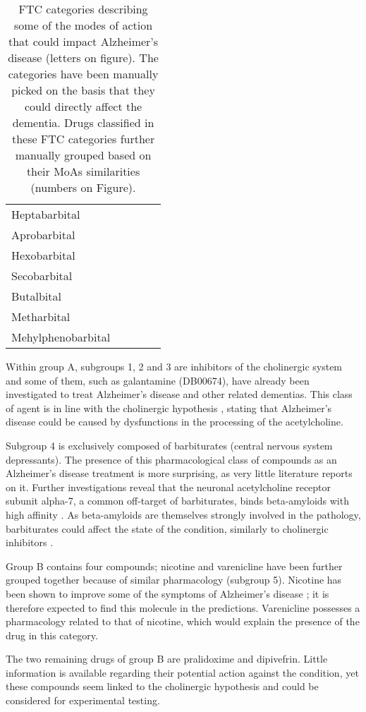 \begin{table}[htbp]
\begin{tabular}{|p{2.5cm}|p{2.5cm}|p{2.5cm}|p{2.5cm}|p{2.5cm}|}
Heptabarbital &  &  &  &  \\ 
Aprobarbital &  &  &  &  \\ 
Hexobarbital &  &  &  &  \\ 
Secobarbital &  &  &  &  \\ 
Butalbital &  &  &  &  \\ 
Metharbital &  &  &  &  \\ 
Mehylphenobarbital &  &  &  &  \\ \hline
\end{tabular}
\caption{FTC categories describing some of the modes of 
action that could impact Alzheimer's disease (letters on figure). The categories have been manually picked on the basis that they could directly affect
the dementia. Drugs classified in these FTC categories further 
manually grouped based on their MoAs similarities (numbers on Figure).}
\label{table:alz}
\end{table}

Within group A, subgroups 1, 2 and 3 are inhibitors of the cholinergic system and some of them, such as galantamine (DB00674), have  already been investigated to treat Alzheimer's disease and other related dementias. This class of agent is in line with the cholinergic hypothesis \citep{babic1999cholinergic}, stating that Alzheimer's disease could be caused by dysfunctions in the processing of the acetylcholine.

Subgroup 4 is exclusively composed of barbiturates (central nervous system depressants). The presence of this pharmacological class of compounds as an Alzheimer's disease treatment is more surprising, as very little literature reports on it. Further investigations reveal that the neuronal acetylcholine receptor subunit alpha-7, a common off-target of barbiturates, binds beta-amyloids with high affinity \citep{wang2000amyloid}. As beta-amyloids are themselves strongly involved in the pathology, barbiturates could affect the state of the condition, similarly to cholinergic inhibitors \citep{wang2000amyloid}.

Group B contains four compounds; nicotine and varenicline have been further grouped together because of similar pharmacology (subgroup 5). Nicotine has been shown to improve some of the symptoms of Alzheimer's disease \citep{jones1992effects}; it is therefore expected to find this molecule in the predictions. Varenicline possesses a pharmacology related to that of nicotine, which would explain the presence of the drug in this category.

The two remaining drugs of group B are pralidoxime and dipivefrin. Little information is available regarding their potential action against the condition, yet these compounds seem linked to the cholinergic hypothesis and could be considered for experimental testing.

